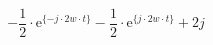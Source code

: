 \[
-\frac{1}{2}\cdot\textrm{e}^{\{- j \cdot 2w \cdot t \}}
-\frac{1}{2}\cdot\textrm{e}^{\{ j \cdot 2w \cdot t \}}
+2j
\]
